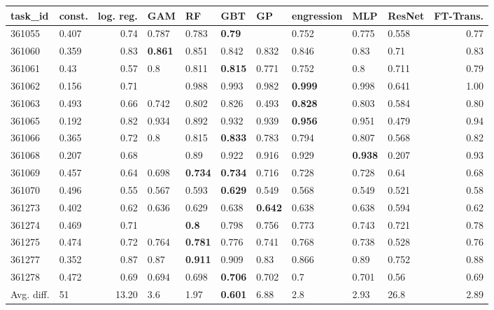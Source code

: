\begin{table}[ht!]
\centering
\begingroup\footnotesize
\begin{tabular}{llrlllllllr}
  \hline
\hline
task\_id & const. & log. reg. & GAM & RF & GBT & GP & engression & MLP & ResNet & FT-Trans. \\ 
  \hline
361055 & 0.407 & 0.74 & 0.787 & 0.783 & \textbf{0.79} &  & 0.752 & 0.775 & 0.558 & 0.77 \\ 
  361060 & 0.359 & 0.83 & \textbf{0.861} & 0.851 & 0.842 & 0.832 & 0.846 & 0.83 & 0.71 & 0.83 \\ 
  361061 & 0.43 & 0.57 & 0.8 & 0.811 & \textbf{0.815} & 0.771 & 0.752 & 0.8 & 0.711 & 0.79 \\ 
  361062 & 0.156 & 0.71 &  & 0.988 & 0.993 & 0.982 & \textbf{0.999} & 0.998 & 0.641 & 1.00 \\ 
  361063 & 0.493 & 0.66 & 0.742 & 0.802 & 0.826 & 0.493 & \textbf{0.828} & 0.803 & 0.584 & 0.80 \\ 
  361065 & 0.192 & 0.82 & 0.934 & 0.892 & 0.932 & 0.939 & \textbf{0.956} & 0.951 & 0.479 & 0.94 \\ 
  361066 & 0.365 & 0.72 & 0.8 & 0.815 & \textbf{0.833} & 0.783 & 0.794 & 0.807 & 0.568 & 0.82 \\ 
  361068 & 0.207 & 0.68 &  & 0.89 & 0.922 & 0.916 & 0.929 & \textbf{0.938} & 0.207 & 0.93 \\ 
  361069 & 0.457 & 0.64 & 0.698 & \textbf{0.734} & \textbf{0.734} & 0.716 & 0.728 & 0.728 & 0.64 & 0.68 \\ 
  361070 & 0.496 & 0.55 & 0.567 & 0.593 & \textbf{0.629} & 0.549 & 0.568 & 0.549 & 0.521 & 0.58 \\ 
  361273 & 0.402 & 0.62 & 0.636 & 0.629 & 0.638 & \textbf{0.642} & 0.638 & 0.638 & 0.594 & 0.62 \\ 
  361274 & 0.469 & 0.71 &  & \textbf{0.8} & 0.798 & 0.756 & 0.773 & 0.743 & 0.721 & 0.78 \\ 
  361275 & 0.474 & 0.72 & 0.764 & \textbf{0.781} & 0.776 & 0.741 & 0.768 & 0.738 & 0.528 & 0.76 \\ 
  361277 & 0.352 & 0.87 & 0.87 & \textbf{0.911} & 0.909 & 0.83 & 0.866 & 0.89 & 0.752 & 0.88 \\ 
  361278 & 0.472 & 0.69 & 0.694 & 0.698 & \textbf{0.706} & 0.702 & 0.7 & 0.701 & 0.56 & 0.69 \\ 
   \hline
Avg. diff. & 51 & 13.20 & 3.6 & 1.97 & \textbf{0.601} & 6.88 & 2.8 & 2.93 & 26.8 & 2.89 \\ 

\end{tabular}
\end{table}
